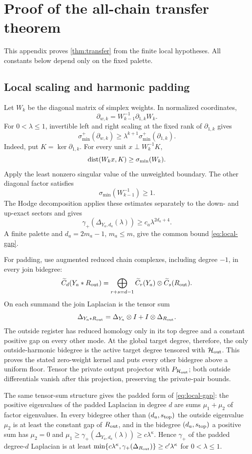\section{Proof of the all-chain transfer theorem}
\label{app:transfer-proof}

This appendix proves \cref{thm:transfer} from the finite local hypotheses. All constants below depend only on the fixed palette.

\subsection{Local scaling and harmonic padding}
\label{app:local-padding}

Let \(W_k\) be the diagonal matrix of simplex weights.  In normalized
coordinates,
\[
\partial_{w,k}=W_{k-1}^{-1}\partial_{1,k}W_k.
\]
For \(0<\lambda\le1\), invertible left and right scaling at the fixed rank of
\(\partial_{1,k}\) gives
\[
\sigma_{\min}^+(\partial_{w,k})
\ge\lambda^{k+1}\sigma_{\min}^+(\partial_{1,k}).
\]
Indeed, put \(K=\ker\partial_{1,k}\).  For every unit
\(x\perp W_k^{-1}K\),
\[
\operatorname{dist}(W_kx,K)\ge\sigma_{\min}(W_k).
\]
Apply the least nonzero singular value of the unweighted boundary.  The other
diagonal factor satisfies
\[
\sigma_{\min}(W_{k-1}^{-1})\ge1.
\]
The Hodge decomposition applies these estimates separately to the down- and
up-exact sectors and gives
\[
\gamma_+(\Delta_{Y_a,d_a}(\lambda))
\ge c_a\lambda^{2d_a+4}.
\]
A finite palette and \(d_a=2m_a-1\), \(m_a\le m\), give the common bound
\cref{eq:local-gap}.

For padding, use augmented reduced chain complexes, including degree \(-1\),
in every join bidegree:
\[
\widetilde C_d(Y_a*R_{\rm out})
=\bigoplus_{r+s=d-1}
\widetilde C_r(Y_a)\otimes\widetilde C_s(R_{\rm out}).
\]
On each summand the join Laplacian is the tensor sum
\[
\Delta_{Y_a*R_{\rm out}}
=\Delta_{Y_a}\otimes I+I\otimes\Delta_{R_{\rm out}}.
\]
The outside register has reduced homology only in its top degree and a
constant positive gap on every other mode.  At the global target degree,
therefore, the only outside-harmonic bidegree is the active target degree
tensored with \(\mathcal{H}_{\rm out}\).  This proves the stated zero-weight kernel
and puts every other bidegree above a uniform floor.  Tensor the private
output projector with \(P_{\mathcal{H}_{\rm out}}\); both outside differentials vanish
after this projection, preserving the private-pair bounds.

The same tensor-sum structure gives the padded form of
\cref{eq:local-gap}: the positive eigenvalues of the padded Laplacian in
degree \(d\) are sums \(\mu_1+\mu_2\) of factor eigenvalues.  In every
bidegree other than \((d_a,s_{\rm top})\) the outside eigenvalue \(\mu_2\) is
at least the constant gap of \(R_{\rm out}\), and in the bidegree
\((d_a,s_{\rm top})\) a positive sum has \(\mu_2=0\) and
\(\mu_1\ge\gamma_+(\Delta_{Y_a,d_a}(\lambda))\ge c\lambda^\kappa\).  Hence
\(\gamma_+\) of the padded degree-\(d\) Laplacian is at least
\(\min\{c\lambda^\kappa,\gamma_+(\Delta_{R_{\rm out}})\}\ge c'\lambda^\kappa\)
for \(0<\lambda\le1\).

